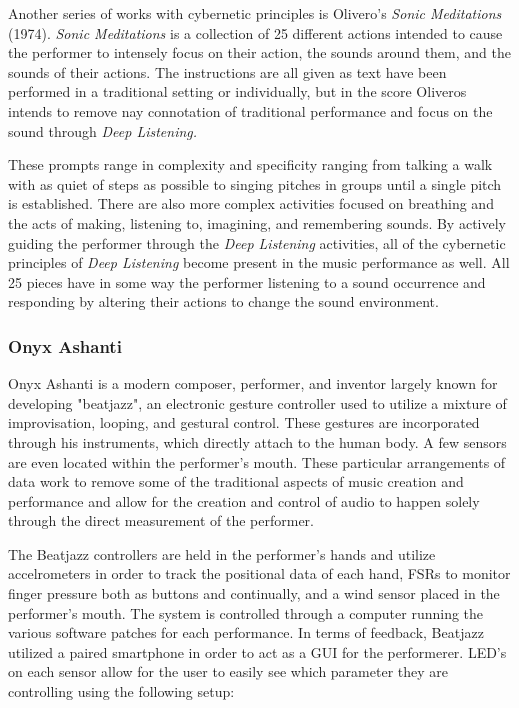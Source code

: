 Another series of works with cybernetic principles is Olivero's \textit{Sonic Meditations} (1974). \textit{Sonic Meditations} is a collection of 25 different actions intended to cause the performer to intensely focus on their action, the sounds around them, and the sounds of their actions\cite{OliverosMeditations}. The instructions are all given as text have been performed in a traditional setting or individually, but in the score Oliveros intends to remove nay connotation of traditional performance and focus on the sound through \textit{Deep Listening.} 

These prompts range in complexity and specificity ranging from talking a walk with as quiet of steps as possible to singing pitches in groups until a single pitch is established. There are also more complex activities focused on breathing and the acts of making, listening to, imagining, and remembering sounds\cite{OliverosMeditations}. By actively guiding the performer through the \textit{Deep Listening} activities, all of the cybernetic principles of \textit{Deep Listening} become present in the music performance as well. All 25 pieces have in some way the performer listening to a sound occurrence and responding by altering their actions to change the sound environment.

\subsubsection{Onyx Ashanti} %
Onyx Ashanti is a modern composer, performer, and inventor largely known for developing "beatjazz", an electronic gesture controller used to utilize a mixture of improvisation, looping, and gestural control. These gestures are incorporated through his instruments, which directly attach to the human body. A few sensors are even located within the performer's mouth. These particular arrangements of data work to remove some of the traditional aspects of music creation and performance and allow for the creation and control of audio to happen solely through the direct measurement of the performer.

The Beatjazz controllers are held in the performer's hands and utilize accelrometers in order to track the positional data of each hand, FSRs to monitor finger pressure both as buttons and continually, and a wind sensor placed in the performer's mouth. The system is controlled through a computer running the various software patches for each performance. In terms of feedback, Beatjazz utilized a paired smartphone in order to act as a GUI for the performerer. LED's on each sensor allow for the user to easily see which parameter they are controlling using the following setup:

